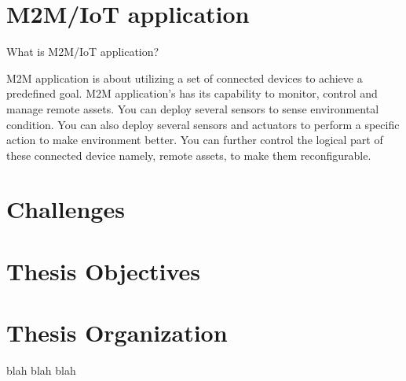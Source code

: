\section{M2M/IoT application}
What is M2M/IoT application?

M2M application is about utilizing a set of connected devices to achieve a predefined goal. M2M application’s has its capability to monitor, control and manage remote assets. You can deploy several sensors to sense environmental condition. You can also deploy several sensors and actuators to perform a specific action to make environment better. You can further control the logical part of these connected device namely, remote assets, to make them reconfigurable.

\section{Challenges}

\section{Thesis Objectives}

\section{Thesis Organization}
blah blah blah 



